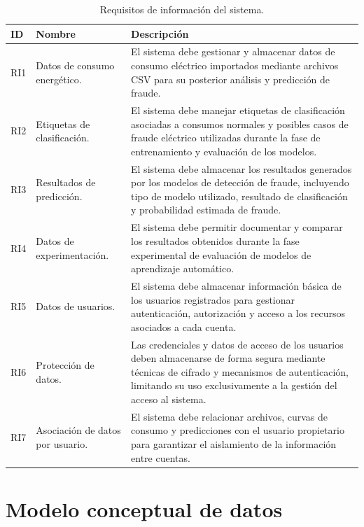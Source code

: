 \documentclass[12pt,a4paper]{report}
\begin{document}
\begin{table}[H]
\centering
\begin{tabular}{|p{2cm}|p{5cm}|p{7cm}|}
\hline
\textbf{ID} & \textbf{Nombre} & \textbf{Descripción} \\ \hline

RI1 & Datos de consumo energético. & El sistema debe gestionar y almacenar datos de consumo eléctrico importados mediante archivos CSV para su posterior análisis y predicción de fraude. \\ \hline

RI2 & Etiquetas de clasificación. & El sistema debe manejar etiquetas de clasificación asociadas a consumos normales y posibles casos de fraude eléctrico utilizadas durante la fase de entrenamiento y evaluación de los modelos. \\ \hline

RI3 & Resultados de predicción. & El sistema debe almacenar los resultados generados por los modelos de detección de fraude, incluyendo tipo de modelo utilizado, resultado de clasificación y probabilidad estimada de fraude. \\ \hline

RI4 & Datos de experimentación. & El sistema debe permitir documentar y comparar los resultados obtenidos durante la fase experimental de evaluación de modelos de aprendizaje automático. \\ \hline

RI5 & Datos de usuarios. & El sistema debe almacenar información básica de los usuarios registrados para gestionar autenticación, autorización y acceso a los recursos asociados a cada cuenta. \\ \hline

RI6 & Protección de datos. & Las credenciales y datos de acceso de los usuarios deben almacenarse de forma segura mediante técnicas de cifrado y mecanismos de autenticación, limitando su uso exclusivamente a la gestión del acceso al sistema. \\ \hline

RI7 & Asociación de datos por usuario. & El sistema debe relacionar archivos, curvas de consumo y predicciones con el usuario propietario para garantizar el aislamiento de la información entre cuentas. \\ \hline

\end{tabular}
\caption{Requisitos de información del sistema.}
\end{table}


\section{Modelo conceptual de datos}
\end{document}
